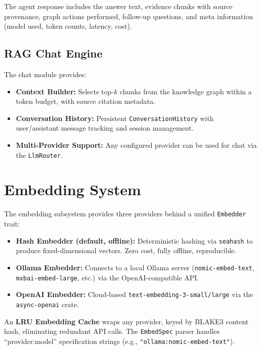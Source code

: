 \documentclass[11pt,twocolumn]{article}
\begin{document}
The agent response includes the answer text, evidence chunks with source provenance, graph actions performed, follow-up questions, and meta information (model used, token counts, latency, cost).

\subsection{RAG Chat Engine}

The chat module provides:
\begin{itemize}[nosep]
  \item \textbf{Context Builder:} Selects top-$k$ chunks from the knowledge graph within a token budget, with source citation metadata.
  \item \textbf{Conversation History:} Persistent \texttt{ConversationHistory} with user/assistant message tracking and session management.
  \item \textbf{Multi-Provider Support:} Any configured provider can be used for chat via the \texttt{LlmRouter}.
\end{itemize}

\section{Embedding System}
\label{sec:embeddings}

The embedding subsystem provides three providers behind a unified \texttt{Embedder} trait:

\begin{itemize}[nosep]
  \item \textbf{Hash Embedder (default, offline):} Deterministic hashing via \texttt{seahash} to produce fixed-dimensional vectors. Zero cost, fully offline, reproducible.
  \item \textbf{Ollama Embedder:} Connects to a local Ollama server (\texttt{nomic-embed-text}, \texttt{mxbai-embed-large}, etc.) via the OpenAI-compatible API.
  \item \textbf{OpenAI Embedder:} Cloud-based \texttt{text-embedding-3-small/large} via the \texttt{async-openai} crate.
\end{itemize}

An \textbf{LRU Embedding Cache} wraps any provider, keyed by BLAKE3 content hash, eliminating redundant API calls. The \texttt{EmbedSpec} parser handles ``provider:model'' specification strings (e.g., \texttt{"ollama:nomic-embed-text"}).
\end{document}
